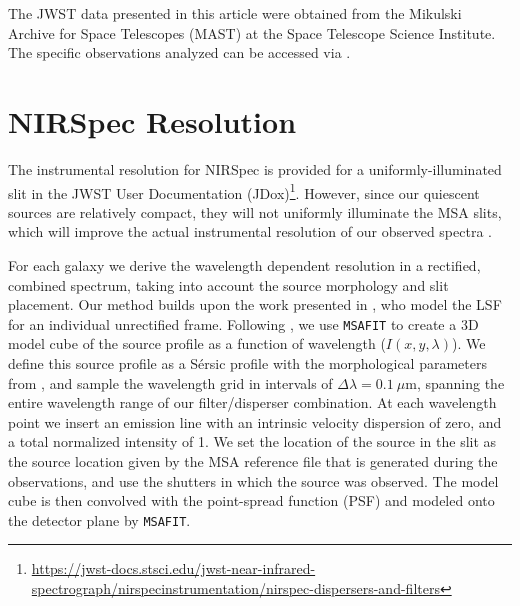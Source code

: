 \documentclass[twocolumn, astrosymb]{aastex631}
\begin{document}


The JWST data presented in this article were obtained from the Mikulski Archive for Space Telescopes (MAST) at the Space Telescope Science Institute. The specific observations analyzed can be accessed via .

{}


\appendix
\restartappendixnumbering
\section{NIRSpec Resolution}\label{ap:LSF}
The instrumental resolution for NIRSpec is provided for a uniformly-illuminated slit in the JWST User Documentation (JDox)\footnote{\url{https://jwst-docs.stsci.edu/jwst-near-infrared-spectrograph/nirspecinstrumentation/nirspec-dispersers-and-filters}}. However, since our quiescent sources are relatively compact, they will not uniformly illuminate the MSA slits, which will improve the actual instrumental resolution of our observed spectra \citep[e.g.][]{AdeGraaff2023,DNidever2024, TNanayakkara2024}.

For each galaxy we derive the wavelength dependent resolution in a rectified, combined spectrum, taking into account the source morphology and slit placement.  Our method builds upon the work presented in \citet{AdeGraaff2023}, who model the LSF for an individual unrectified frame. Following \citet{AdeGraaff2023}, we use \texttt{MSAFIT} to create a 3D model cube of the source profile as a function of wavelength ($I(x,y,\lambda)$). We define this source profile as a S\'ersic profile with the morphological parameters from \citet{SCutler2022}, and sample the wavelength grid in intervals of $\Delta\lambda = 0.1~\mu$m, spanning the entire wavelength range of our filter/disperser combination. At each wavelength point we insert an emission line with an intrinsic velocity dispersion of zero, and a total normalized intensity of 1. We set the location of the source in the slit as the source location given by the MSA reference file that is generated during the observations, and use the shutters in which the source was observed. The model cube is then convolved with the point-spread function (PSF) and modeled onto the detector plane by \texttt{MSAFIT}.
\end{document}
